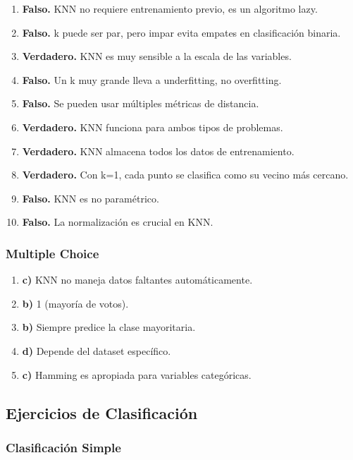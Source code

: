 \documentclass[12pt]{article}
\begin{document}
\begin{enumerate}
    \item \textbf{Falso.} KNN no requiere entrenamiento previo, es un algoritmo lazy.
    \item \textbf{Falso.} k puede ser par, pero impar evita empates en clasificación binaria.
    \item \textbf{Verdadero.} KNN es muy sensible a la escala de las variables.
    \item \textbf{Falso.} Un k muy grande lleva a underfitting, no overfitting.
    \item \textbf{Falso.} Se pueden usar múltiples métricas de distancia.
    \item \textbf{Verdadero.} KNN funciona para ambos tipos de problemas.
    \item \textbf{Verdadero.} KNN almacena todos los datos de entrenamiento.
    \item \textbf{Verdadero.} Con k=1, cada punto se clasifica como su vecino más cercano.
    \item \textbf{Falso.} KNN es no paramétrico.
    \item \textbf{Falso.} La normalización es crucial en KNN.
\end{enumerate}

\subsubsection{Multiple Choice}

\begin{enumerate}
    \item \textbf{c)} KNN no maneja datos faltantes automáticamente.
    \item \textbf{b)} 1 (mayoría de votos).
    \item \textbf{b)} Siempre predice la clase mayoritaria.
    \item \textbf{d)} Depende del dataset específico.
    \item \textbf{c)} Hamming es apropiada para variables categóricas.
\end{enumerate}

\subsection{Ejercicios de Clasificación}

\subsubsection{Clasificación Simple}
\end{document}
